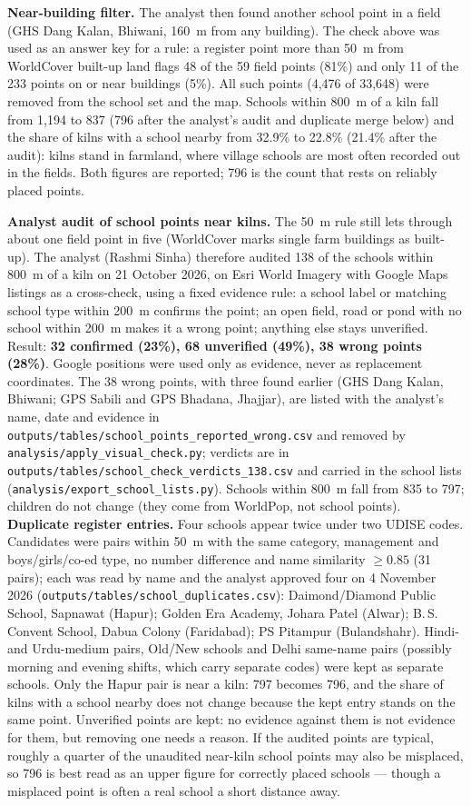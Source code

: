 \documentclass[11pt,a4paper]{article}
\begin{document}
\textbf{Near-building filter.} The analyst then found another school point in a
field (GHS Dang Kalan, Bhiwani, 160~m from any building). The check above was used
as an answer key for a rule: a register point more than 50~m from WorldCover
built-up land flags 48 of the 59 field points (81\%) and only 11 of the 233 points on
or near buildings (5\%). All such points (4{,}476 of 33{,}648) were removed from the
school set and the map. Schools within 800~m of a kiln fall from 1{,}194 to 837 (796 after the analyst's audit and duplicate merge below) and
the share of kilns with a school nearby from 32.9\% to 22.8\% (21.4\% after the audit): kilns stand in
farmland, where village schools are most often recorded out in the fields. Both
figures are reported; 796 is the count that rests on reliably placed points.

\textbf{Analyst audit of school points near kilns.} The 50~m rule still lets through about one field
point in five (WorldCover marks single farm buildings as built-up). The analyst (Rashmi Sinha) therefore
audited 138 of the schools within 800~m of a kiln on 21 October 2026, on Esri World Imagery with Google
Maps listings as a cross-check, using a fixed evidence rule: a school label or matching school type within
200~m confirms the point; an open field, road or pond with no school within 200~m makes it a wrong point;
anything else stays unverified. Result: \textbf{32 confirmed (23\%), 68 unverified (49\%), 38 wrong
points (28\%)}. Google positions were used only as evidence, never as replacement coordinates. The 38 wrong
points, with three found earlier (GHS Dang Kalan, Bhiwani; GPS Sabili and GPS Bhadana, Jhajjar), are listed
with the analyst's name, date and evidence in \texttt{outputs/tables/school\_points\_reported\_wrong.csv}
and removed by \texttt{analysis/apply\_visual\_check.py}; verdicts are in
\texttt{outputs/tables/school\_check\_verdicts\_138.csv} and carried in the school lists
(\texttt{analysis/export\_school\_lists.py}). Schools within 800~m fall from 835 to 797; children do not
change (they come from WorldPop, not school points). \textbf{Duplicate register entries.} Four schools appear twice under two UDISE codes. Candidates were pairs within 50~m with the same category, management and boys/girls/co-ed type, no number difference and name similarity $\geq 0.85$ (31 pairs); each was read by name and the analyst approved four on 4 November 2026 (\texttt{outputs/tables/school\_duplicates.csv}): Daimond/Diamond Public School, Sapnawat (Hapur); Golden Era Academy, Johara Patel (Alwar); B.\,S. Convent School, Dabua Colony (Faridabad); PS Pitampur (Bulandshahr). Hindi- and Urdu-medium pairs, Old/New schools and Delhi same-name pairs (possibly morning and evening shifts, which carry separate codes) were kept as separate schools. Only the Hapur pair is near a kiln: 797 becomes 796, and the share of kilns with a school nearby does not change because the kept entry stands on the same point. Unverified points are kept: no evidence against them
is not evidence for them, but removing one needs a reason. If the audited points are typical, roughly a
quarter of the unaudited near-kiln school points may also be misplaced, so 796 is best read as an upper
figure for correctly placed schools --- though a misplaced point is often a real school a short distance
away.
\end{document}
